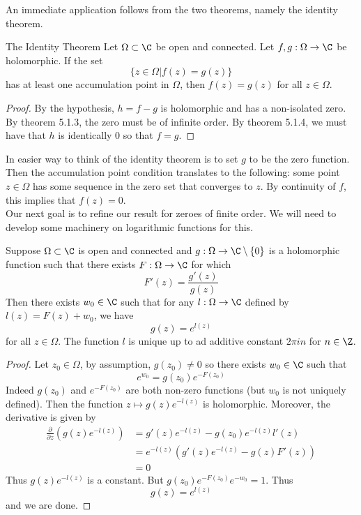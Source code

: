 \documentclass[a4paper]{article}
\begin{document}
An immediate application follows from the two theorems, namely the identity theorem. 

\begin{thm}{The Identity Theorem}{} Let $\Omega\subset\C$ be open and connected. Let $f,g:\Omega\to\C$ be holomorphic. If the set $$\{z\in\Omega|f(z)=g(z)\}$$ has at least one accumulation point in $\Omega$, then $f(z)=g(z)$ for all $z\in\Omega$. 
\begin{proof}
By the hypothesis, $h=f-g$ is holomorphic and has a non-isolated zero. By theorem 5.1.3, the zero must be of infinite order. By theorem 5.1.4, we must have that $h$ is identically $0$ so that $f=g$. 
\end{proof}
\end{thm}

In easier way to think of the identity theorem is to set $g$ to be the zero function. Then the accumulation point condition translates to the following: some point $z\in\Omega$ has some sequence in the zero set that converges to $z$. By continuity of $f$, this implies that $f(z)=0$. \\

Our next goal is to refine our result for zeroes of finite order. We will need to develop some machinery on logarithmic functions for this. 

\begin{lmm}{}{} Suppose $\Omega\subset\C$ is open and connected and $g:\Omega\to\C\setminus\{0\}$ is a holomorphic function such that there exists $F:\Omega\to\C$ for which $$F'(z)=\frac{g'(z)}{g(z)}$$ Then there exists $w_0\in\C$ such that for any $l:\Omega\to\C$ defined by $l(z)=F(z)+w_0$, we have $$g(z)=e^{l(z)}$$ for all $z\in\Omega$. The function $l$ is unique up to ad additive constant $2\pi i n$ for $n\in\Z$. 
\begin{proof}
Let $z_0\in\Omega$, by assumption, $g(z_0)\neq 0$ so there exists $w_0\in\C$ such that $$e^{w_0}=g(z_0)e^{-F(z_0)}$$ Indeed $g(z_0)$ and $e^{-F(z_0)}$ are both non-zero functions (but $w_0$ is not uniquely defined). Then the function $z\mapsto g(z)e^{-l(z)}$ is holomorphic. Moreover, the derivative is given by 
\begin{align*}
\frac{\partial}{\partial z}\left(g(z)e^{-l(z)}\right)&=g'(z)e^{-l(z)}-g(z_0)e^{-l(z)}l'(z)\\
&=e^{-l(z)}\left(g'(z)e^{-l(z)}-g(z)F'(z)\right)\\
&=0
\end{align*}
Thus $g(z)e^{-l(z)}$ is a constant. But $g(z_0)e^{-F(z_0)}e^{-w_0}=1$. Thus $$g(z)=e^{l(z)}$$ and we are done. 
\end{proof}
\end{lmm}
\end{document}

